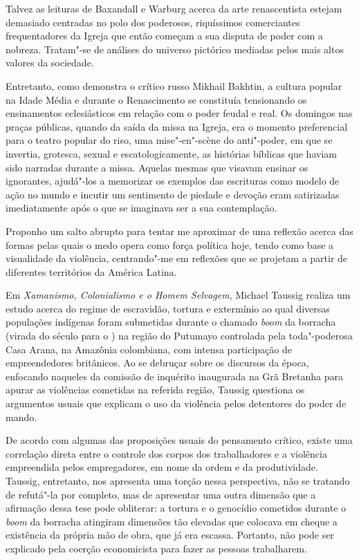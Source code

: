 \asterisc

Talvez as leituras de Baxandall e Warburg acerca da arte renascentista
estejam demasiado centradas no polo dos poderosos, riquíssimos
comerciantes frequentadores da Igreja que então começam a sua disputa de
poder com a nobreza. Tratam"-se de análises do universo pictórico
mediadas pelos mais altos valores da sociedade.

Entretanto, como demonstra o crítico russo Mikhail Bakhtin, a cultura
popular na Idade Média e durante o Renascimento se constituía
tensionando os ensinamentos eclesiásticos em relação com o poder feudal
e real. Os domingos nas praças públicas, quando da saída da missa na
Igreja, era o momento preferencial para o teatro popular do riso, uma
mise"-en"-scène do anti"-poder, em que se invertia, grotesca, sexual e
escatologicamente, as histórias bíblicas que haviam sido narradas
durante a missa. Aquelas mesmas que visavam ensinar os ignorantes,
ajudá"-los a memorizar os exemplos das escrituras como modelo de ação no
mundo e incutir um sentimento de piedade e devoção eram satirizadas
imediatamente após o que se imaginava ser a sua contemplação.

\asterisc

Proponho um salto abrupto para tentar me aproximar de uma reflexão
acerca das formas pelas quais o medo opera como força política hoje,
tendo como base a visualidade da violência, centrando"-me em reflexões
que se projetam a partir de diferentes territórios da América Latina.

Em \emph{Xamanismo, Colonialismo e o Homem Selvagem}, Michael Taussig
realiza um estudo acerca do regime de escravidão, tortura e extermínio
ao qual diversas populações indígenas foram submetidas durante o chamado
\emph{boom} da borracha (virada do século  para o ) na região do
Putumayo controlada pela toda"-poderosa Casa Arana, na Amazônia
colombiana, com intensa participação de empreendedores britânicos. Ao se
debruçar sobre os discursos da época, enfocando naqueles da comissão de
inquérito inaugurada na Grã Bretanha para apurar as violências cometidas
na referida região, Taussig questiona os argumentos usuais que explicam
o uso da violência pelos detentores do poder de mando.

De acordo com algumas das proposições usuais do pensamento crítico,
existe uma correlação direta entre o controle dos corpos dos
trabalhadores e a violência empreendida pelos empregadores, em nome da
ordem e da produtividade. Taussig, entretanto, nos apresenta uma torção
nessa perspectiva, não se tratando de refutá"-la por completo, mas de
apresentar uma outra dimensão que a afirmação dessa tese pode obliterar:
a tortura e o genocídio cometidos durante o \emph{boom} da borracha
atingiram dimensões tão elevadas que colocava em cheque a existência da
própria mão de obra, que já era escassa. Portanto, não pode ser
explicado pela coerção economicista para fazer as pessoas trabalharem.

